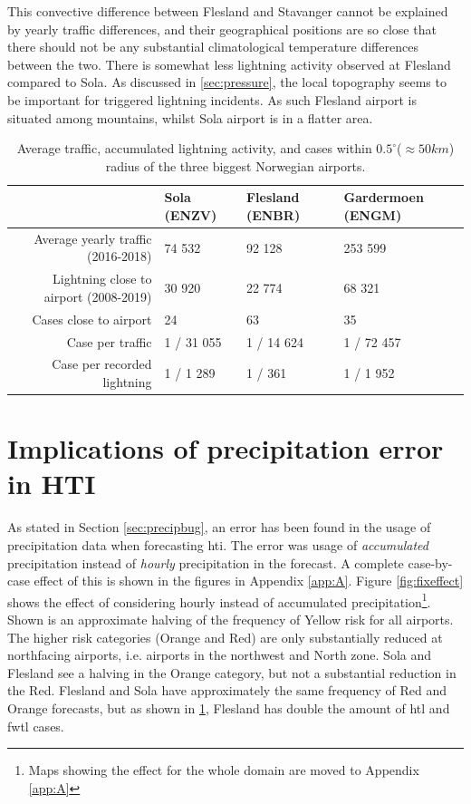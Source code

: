 This convective difference between Flesland and Stavanger cannot be explained by yearly traffic differences, and their geographical positions are so close that there should not be any substantial climatological temperature differences between the two. There is somewhat less lightning activity observed at Flesland compared to Sola. As discussed in \ref{sec:pressure}, the local topography seems to be important for triggered lightning incidents. As such Flesland airport is situated among mountains, whilst Sola airport is in a flatter area.

\begin{table}[H]
        \begin{tabular}{r|l|l|l|}
            & Sola (ENZV) & Flesland (ENBR) & Gardermoen (ENGM) \\\hline
            Average yearly traffic (2016-2018)  & 74 532 & 92 128 & 253 599   \\\hline
            Lightning close to airport (2008-2019) & 30 920 & 22 774 & 68 321 \\\hline
            Cases close to airport & 24 & 63  & 35 \\\hline
            Case per traffic  & 1 / 31 055 & 1 / 14 624 & 1 / 72 457 \\\hline
            Case per recorded lightning & 1 / 1 289 & 1 / 361 & 1 / 1 952 \\\hline
        \end{tabular}
     \caption{Average traffic, accumulated lightning activity, and cases within $0.5^{\circ}$($\approx 50km$) radius of the three biggest Norwegian airports.}
     \label{tab:traffic}
\end{table}


\section{Implications of precipitation error in HTI}
As stated in Section \ref{sec:precipbug}, an error has been found in the usage of precipitation data when forecasting \acrshort{hti}. The error was usage of \textit{accumulated} precipitation instead of \textit{hourly} precipitation in the forecast. A complete case-by-case effect of this is shown in the figures in Appendix \ref{app:A}. Figure \ref{fig:fixeffect} shows the effect of considering hourly instead of accumulated precipitation\footnote{Maps showing the effect for the whole domain are moved to Appendix \ref{app:A}}. Shown is an approximate halving of the frequency of Yellow risk for all airports. The higher risk categories (Orange and Red) are only substantially reduced at northfacing airports, i.e. airports in the northwest and North zone. Sola and Flesland see a halving in the Orange category, but not a substantial reduction in the Red. Flesland and Sola have approximately the same frequency of Red and Orange forecasts, but as shown in \ref{tab:traffic}, Flesland has double the amount of \acrshort{htl} and \acrshort{fwtl} cases.

